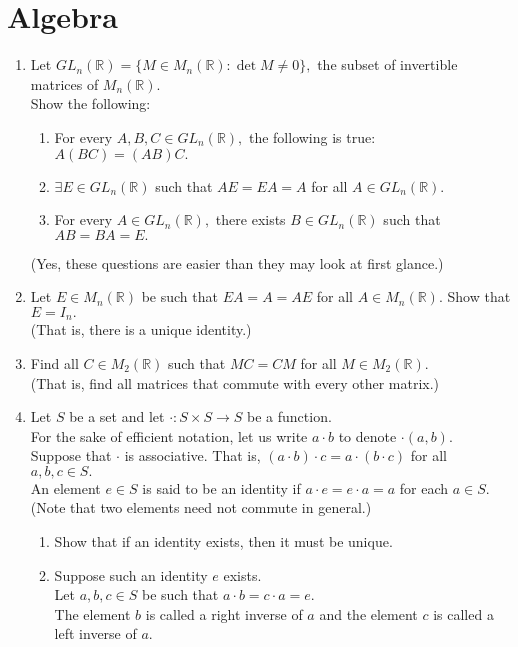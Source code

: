 \documentclass[12pt]{article}
\begin{document}
\section{Algebra}
\begin{enumerate}[leftmargin=*]
	\item Let $GL_n(\mathbb{R}) = \{M \in M_n(\mathbb{R}) : \det M \neq 0\},$ the subset of invertible matrices of $M_n(\mathbb{R}).$\\
	Show the following:
	\begin{enumerate}[nosep] 
		\item For every $A, B, C \in GL_n(\mathbb{R}),$ the following is true: $A(BC) = (AB)C.$ 
		\item $\exists E \in GL_n(\mathbb{R})$ such that $AE = EA = A$ for all $A \in GL_n(\mathbb{R}).$
		\item For every $A \in GL_n(\mathbb{R}),$ there exists $B \in GL_n(\mathbb{R})$ such that $AB = BA = E.$
	\end{enumerate}
	(Yes, these questions are easier than they may look at first glance.)
	\item Let $E \in M_n(\mathbb{R})$ be such that $EA = A = AE$ for all $A \in M_n(\mathbb{R}).$ Show that $E = I_n.$\\
	(That is, there is a unique identity.)
	\item Find all $C \in M_2(\mathbb{R})$ such that $MC = CM$ for all $M \in M_2(\mathbb{R}).$\\
	(That is, find all matrices that commute with every other matrix.)
	\item Let $S$ be a set and let $\cdot:S\times S\to S$ be a function.\\
	For the sake of efficient notation, let us write $a\cdot b$ to denote $\cdot(a, b).$\\
	Suppose that $\cdot$ is associative. That is, $(a\cdot b)\cdot c = a\cdot(b\cdot c)$ for all $a, b, c \in S.$\\
	An element $e \in S$ is said to be an identity if $a\cdot e = e \cdot a = a$ for each $a \in S.$ (Note that two elements need not commute in general.)
	\begin{enumerate}[nosep] 
		\item Show that if an identity exists, then it must be unique.
		\item Suppose such an identity $e$ exists.\\
		Let $a, b, c \in S$ be such that $a \cdot b = c \cdot a = e.$\\
		The element $b$ is called a right inverse of $a$ and the element $c$ is called a left inverse of $a.$

\end{enumerate}
\end{enumerate}
\end{document}
